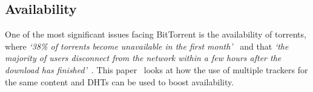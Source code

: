 \subsection*{Availability}
\label{subsec:availability}

One of the most significant issues facing BitTorrent is the availability of torrents, where \textit{`38\% of torrents become unavailable in the first month'}~\cite{kaune_unraveling_2010} and that \textit{`the majority of users disconnect from the network within a few hours after the download has finished'}~\cite{pouwelse_bittorrent_2005}.
This paper~\cite{neglia_availability_2007} looks at how the use of multiple trackers for the same content and DHTs can be used to boost availability.
